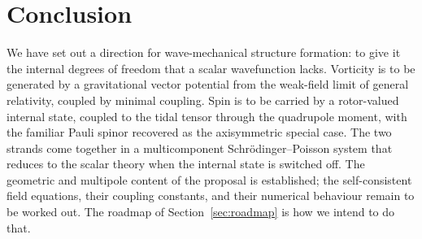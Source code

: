 \documentclass[11pt,a4paper]{article}
\begin{document}
\section{Conclusion}
\label{sec:conclusion}

We have set out a direction for wave-mechanical structure formation: to give it the
internal degrees of freedom that a scalar wavefunction lacks. Vorticity is to be
generated by a gravitational vector potential from the weak-field limit of general
relativity, coupled by minimal coupling. Spin is to be carried by a rotor-valued
internal state, coupled to the tidal tensor through the quadrupole moment, with the
familiar Pauli spinor recovered as the axisymmetric special case. The two strands come
together in a multicomponent Schr\"odinger--Poisson system that reduces to the scalar
theory when the internal state is switched off. The geometric and multipole content of
the proposal is established; the self-consistent field equations, their coupling
constants, and their numerical behaviour remain to be worked out. The roadmap of
Section~\ref{sec:roadmap} is how we intend to do that.



\end{document}
